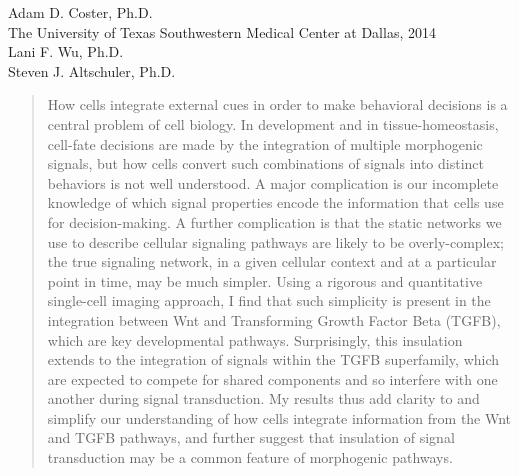 
\begin{center}

\vspace*{118pt}
\textsc{\myTitle}

\vspace*{66pt}
Adam D. Coster, Ph.D.\\

The University of Texas Southwestern Medical Center at Dallas, 2014\\

\vspace*{33pt}
Lani F. Wu, Ph.D.\\
Steven J. Altschuler, Ph.D.\\

\vspace*{33pt}
\begin{quotation}
How cells integrate external cues in order to make behavioral decisions is a central problem of cell biology. In development and in tissue-homeostasis, cell-fate decisions are made by the integration of multiple morphogenic signals, but how cells convert such combinations of signals into distinct behaviors is not well understood. A major complication is our incomplete knowledge of which signal properties encode the information that cells use for decision-making. A further complication is that the static networks we use to describe cellular signaling pathways are likely to be overly-complex; the true signaling network, in a given cellular context and at a particular point in time, may be much simpler. Using a rigorous and quantitative single-cell imaging approach, I find that such simplicity is present in the integration between Wnt and Transforming Growth Factor Beta (TGFB), which are key developmental pathways. Surprisingly, this insulation extends to the integration of signals within the TGFB superfamily, which are expected to compete for shared components and so interfere with one another during signal transduction. My results thus add clarity to and simplify our understanding of how cells integrate information from the Wnt and TGFB pathways, and further suggest that insulation of signal transduction may be a common feature of morphogenic pathways.
\end{quotation}

\end{center}